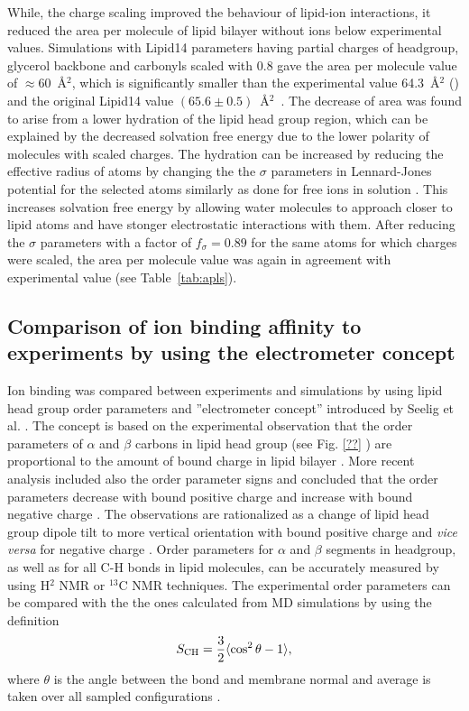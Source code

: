 \documentclass[aip,jcp,twocolumn]{revtex4}
\begin{document}
While, the charge scaling improved the behaviour of lipid-ion interactions,
it reduced the area per molecule of lipid bilayer without ions below experimental
values. Simulations with Lipid14 parameters having partial charges of headgroup, glycerol
backbone and carbonyls scaled with 0.8 gave the area per molecule value of $\approx$60~\AA$^2$,
which is significantly smaller than the experimental value 64.3~\AA$^2$ (\cite{})
and the original Lipid14 value $(65.6 \pm 0.5)$~\AA$^2$~\cite{dickson14}.
The decrease of area was found to arise from a lower hydration of the lipid head group region,
which can be explained by the decreased solvation free energy due to the lower polarity
of molecules with scaled charges. The hydration can be increased
by reducing the effective radius of atoms by changing the 
the $\sigma$ parameters in Lennard-Jones potential for the selected atoms
similarly as done for free ions in solution \cite{kohagen14,kohagen16,Pluharova2014}.
This increases solvation free energy by allowing water molecules to
approach closer to lipid atoms and have stonger electrostatic interactions with them.
After reducing the $\sigma$ parameters with a factor of $f_\sigma = 0.89$
for the same atoms for which charges were scaled, the area per molecule value was
again in agreement with experimental value (see Table~\ref{tab:apls}). 


\subsection{Comparison of ion binding affinity to experiments by using the electrometer concept} \label{section:electrometer}
Ion binding was compared between experiments and simulations by 
using lipid head group order parameters and ''electrometer concept'' 
introduced by Seelig et al. \cite{seelig87,catte16}.
The concept is based on the experimental observation that the 
order parameters of $\alpha$ and $\beta$ carbons in lipid head group
(see Fig. \ref{??} 
) 
are proportional to the amount of bound charge
in lipid bilayer \cite{seelig87}.
More recent analysis included also
the order parameter signs and concluded that the order parameters  
decrease with bound positive charge and increase with bound negative 
charge \cite{ollila16,catte16}. The observations are rationalized 
as a change of lipid head group dipole tilt to more vertical orientation
with bound positive charge and {\it vice versa} for negative charge \cite{seelig87}. 
Order parameters for $\alpha$ and $\beta$ segments in headgroup, as well as for
all C-H bonds in lipid molecules,
can be accurately measured by using H$^2$ NMR or $^{13}$C NMR techniques.
The experimental order parameters can be compared with the the ones
calculated from MD simulations by using the definition
\begin{equation}\label{OP}
S_{\rm CH}=\frac{3}{2}\langle \cos^2\theta -1 \rangle,
\end{equation}
where $\theta$ is the angle between the bond and membrane
normal and average is taken over all sampled configurations \cite{ollila16}.
\end{document}
